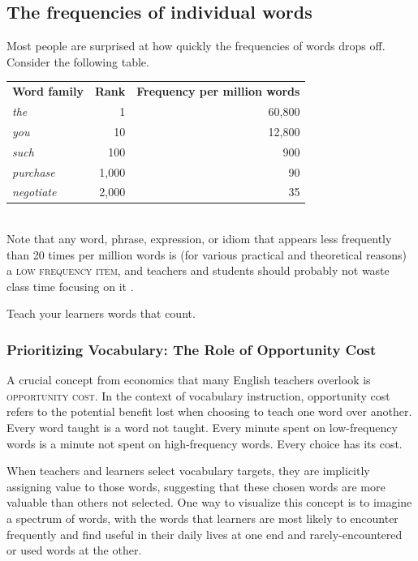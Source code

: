 \subsection*{The frequencies of individual words}\label{sec:word-frequency}

Most people are surprised at how quickly the frequencies of words drops off. Consider the following table.

\begin{tabular}{lrr}
\textbf{Word family} & \textbf{Rank} & \textbf{Frequency per million words} \\
\textit{the} & 1 & 60,800 \\
\textit{you} & 10 & 12,800 \\
\textit{such} & 100 & 900 \\
\textit{purchase} & 1,000 & 90 \\
\textit{negotiate} & 2,000 & 35 \\
\end{tabular}\\

Note that any word, phrase, expression, or idiom that appears less frequently than 20 times per million words is (for various practical and theoretical reasons) a \textsc{low frequency item}, and teachers and students should probably not waste class time focusing on it \citep[16]{Nation2013}.

Teach your learners words that count.

\subsubsection{Prioritizing Vocabulary: The Role of Opportunity Cost} \label{sec:opportunity-cost}

A crucial concept from economics that many English teachers overlook is \textsc{opportunity cost}. In the context of vocabulary instruction, opportunity cost refers to the potential benefit lost when choosing to teach one word over another. Every word taught is a word not taught. Every minute spent on low-frequency words is a minute not spent on high-frequency words. Every choice has its cost.

When teachers and learners select vocabulary targets, they are implicitly assigning value to those words, suggesting that these chosen words are more valuable than others not selected. One way to visualize this concept is to imagine a spectrum of words, with the words that learners are most likely to encounter frequently and find useful in their daily lives at one end and rarely-encountered or used words at the other.

